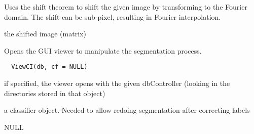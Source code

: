 \documentclass[a4paper]{book}
\begin{document}
%
\begin{Details}\relax
Uses the shift theorem to shift the given image by
transforming to the Fourier domain.  The shift can be
sub-pixel, resulting in Fourier interpolation.
\end{Details}
%
\begin{Value}
the shifted image (matrix)
\end{Value}
%
\begin{Description}\relax
Opens the GUI viewer to manipulate the segmentation
process.
\end{Description}
%
\begin{Usage}
\begin{verbatim}
  ViewCI(db, cf = NULL)
\end{verbatim}
\end{Usage}
%
\begin{Arguments}
\begin{ldescription}
\item[\code{db}] if specified, the viewer opens with the given
dbController (looking in the directories stored in that
object)

\item[\code{cf}] a classifier object.  Needed to allow redoing
segmentation after correcting labels
\end{ldescription}
\end{Arguments}
%
\begin{Value}
NULL
\end{Value}
\printindex{}
\end{document}
